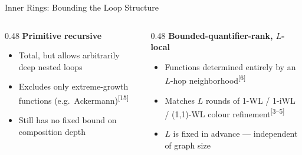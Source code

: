 \documentclass[10pt,aspectratio=169,draft]{beamer}
\newcommand{\pcite}[1]{\textsuperscript{[#1]}}
\begin{document}
\begin{frame}{Inner Rings: Bounding the Loop Structure}
  \begin{columns}[T]
    \begin{column}{0.48\textwidth}
      \textbf{Primitive recursive}
      \begin{itemize}
        \item Total, but allows arbitrarily deep nested loops
        \item Excludes only extreme-growth functions (e.g.\ Ackermann)\pcite{15}
        \item Still has no fixed bound on composition depth
      \end{itemize}
    \end{column}
    \begin{column}{0.48\textwidth}
      \textbf{Bounded-quantifier-rank, $L$-local}
      \begin{itemize}
        \item Functions determined entirely by an $L$-hop neighborhood\pcite{6}
        \item Matches $L$ rounds of 1-WL / 1-iWL / (1,1)-WL colour refinement\pcite{3--5}
        \item $L$ is fixed in advance --- independent of graph size
      \end{itemize}
    \end{column}
  \end{columns}
  \vspace{0.3cm}
  {\footnotesize{}}
\end{frame}
\end{document}
